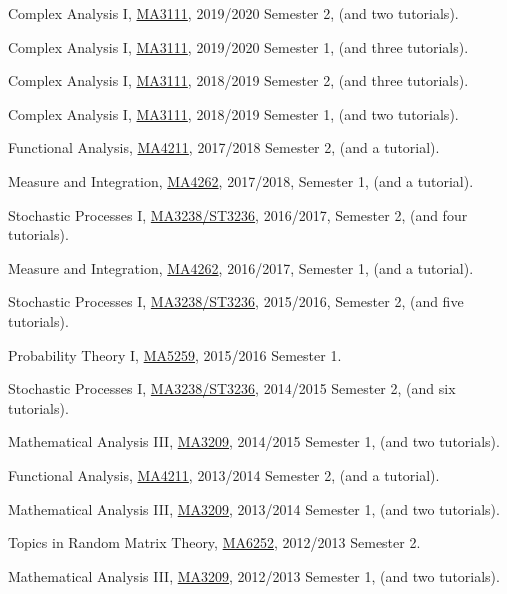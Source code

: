 \documentclass[12pt,a4paper]{article}
\newenvironment{item_list}{
 \begin{list}{}{
   \setlength{\leftmargin}{1.5em}
   \setlength{\itemsep}{0.25em}
   \setlength{\parskip}{0pt}
   \setlength{\parsep}{0.25em}
 }
}{
 \end{list}
}
\begin{document}
\begin{item_list}
\item
  Complex Analysis I, \href{https://wangd-math.github.io/teaching/MA3111_S20/index.html}{MA3111}, 2019/2020 Semester 2, (and two tutorials).
\item
  Complex Analysis I, \href{https://wangd-math.github.io/teaching/MA3111_F19/index.html}{MA3111}, 2019/2020 Semester 1, (and three tutorials).
\item
  Complex Analysis I, \href{https://wangd-math.github.io/teaching/MA3111_S19/index.html}{MA3111}, 2018/2019 Semester 2, (and three tutorials).
\item
  Complex Analysis I, \href{https://wangd-math.github.io/teaching/MA3111_F18/index.html}{MA3111}, 2018/2019 Semester 1, (and two tutorials).
\item
  Functional Analysis, \href{https://wangd-math.github.io/teaching/MA4211_S18/index.html}{MA4211}, 2017/2018 Semester 2, (and a tutorial).
\item
  Measure and Integration, \href{https://wangd-math.github.io/teaching/MA4262_F17/index.html}{MA4262}, 2017/2018, Semester 1, (and a tutorial).
\item
  Stochastic Processes I, \href{https://wangd-math.github.io/teaching/MA3238_ST3236_S17/index.html}{MA3238/ST3236}, 2016/2017, Semester 2, (and four tutorials).
\item
  Measure and Integration, \href{https://wangd-math.github.io/teaching/MA4262_F16/index.html}{MA4262}, 2016/2017, Semester 1, (and a tutorial).
\item
  Stochastic Processes I, \href{https://wangd-math.github.io/teaching/MA3238_ST3236_S16/index.html}{MA3238/ST3236}, 2015/2016, Semester 2, (and five tutorials).
\item
  Probability Theory I, \href{https://wangd-math.github.io/teaching/MA5259_F15/index.html}{MA5259}, 2015/2016 Semester 1.
\item
  Stochastic Processes I, \href{https://wangd-math.github.io/teaching/MA3238_ST3236_S15/index.html}{MA3238/ST3236}, 2014/2015 Semester 2, (and six tutorials).
\item
  Mathematical Analysis III, \href{https://wangd-math.github.io/teaching/MA3209_F14/index.html}{MA3209}, 2014/2015 Semester 1, (and two tutorials).
\item
  Functional Analysis, \href{https://wangd-math.github.io/teaching/MA4211_S14/index.html}{MA4211}, 2013/2014 Semester 2, (and a tutorial).
\item
  Mathematical Analysis III, \href{https://wangd-math.github.io/teaching/MA3209_F13/index.html}{MA3209}, 2013/2014 Semester 1, (and two tutorials).
\item
  Topics in Random Matrix Theory, \href{https://wangd-math.github.io/teaching/MA6252_S13/index.html}{MA6252}, 2012/2013 Semester 2.
\item
  Mathematical Analysis III, \href{https://wangd-math.github.io/teaching/MA3209_F12/index.html}{MA3209}, 2012/2013 Semester 1, (and two tutorials).
\end{item_list}
\end{document}
